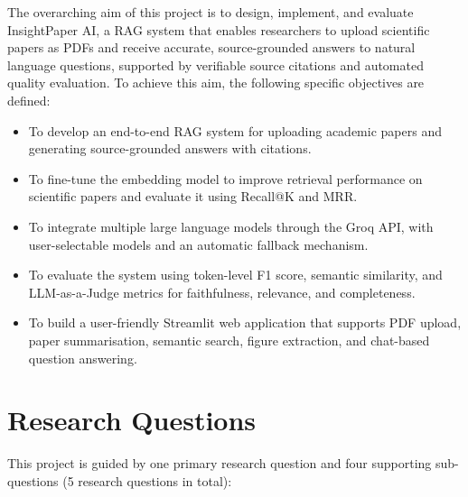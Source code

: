 





The overarching aim of this project is to design, implement, and evaluate InsightPaper AI, a RAG system that enables researchers to upload scientific papers as PDFs and receive accurate, source-grounded answers to natural language questions, supported by verifiable source citations and automated quality evaluation. To achieve this aim, the following specific objectives are defined:

\begin{itemize}

\item To develop an end-to-end RAG system for uploading academic papers and generating source-grounded answers with citations.

\item To fine-tune the embedding model to improve retrieval performance on scientific papers and evaluate it using Recall@K and MRR.

\item To integrate multiple large language models through the Groq API, with user-selectable models and an automatic fallback mechanism.

\item To evaluate the system using token-level F1 score, semantic similarity, and LLM-as-a-Judge metrics for faithfulness, relevance, and completeness.

\item To build a user-friendly Streamlit web application that supports PDF upload, paper summarisation, semantic search, figure extraction, and chat-based question answering.

\end{itemize}

\section{Research Questions}

This project is guided by one primary research question and four supporting sub-questions (5 research questions in total):

